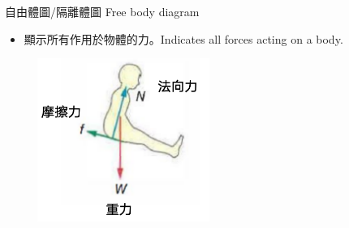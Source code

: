 \documentclass[beamer=true]{standalone}
\begin{document}




\begin{frame}{自由體圖/隔離體圖 Free body diagram}
    \begin{itemize}
        \item 顯示所有作用於物體的力。Indicates all forces acting on a body.\bigskip
    \end{itemize}
    \begin{figure}[h!]
        \centering
        \includegraphics[width=0.5\textwidth]{assets/d2f67986.png}
    \end{figure}
\end{frame}
\end{document}
